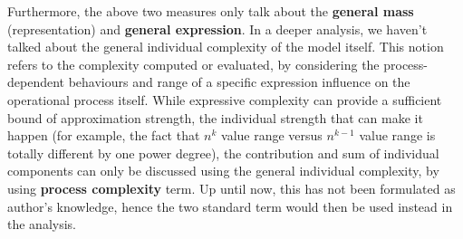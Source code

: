 \documentclass[10pt]{article} %
\begin{document}
Furthermore, the above two measures only talk about the \textbf{general mass} (representation) and \textbf{general expression}. In a deeper analysis, we haven't talked about the general individual complexity of the model itself. This notion refers to the complexity computed or evaluated, by considering the process-dependent behaviours and range of a specific expression influence on the operational process itself. While expressive complexity can provide a sufficient bound of approximation strength, the individual strength that can make it happen (for example, the fact that $n^{k}$ value range versus $n^{k-1}$ value range is totally different by one power degree), the contribution and sum of individual components can only be discussed using the general individual complexity, by using \textbf{process complexity} term. Up until now, this has not been formulated as author's knowledge, hence the two standard term would then be used instead in the analysis. 
\end{document}

